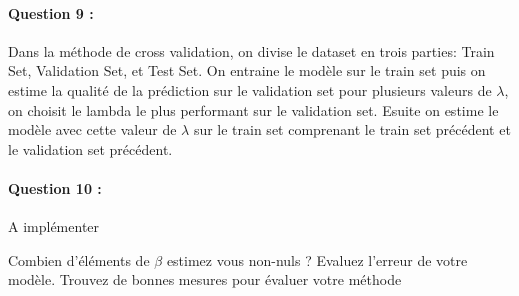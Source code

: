 \documentclass{article}
\begin{document}
\paragraph{Question 9 :}
Dans la méthode de cross validation, on divise le dataset en trois parties: 
Train Set, Validation Set, et Test Set.
On entraine le modèle sur le train set puis on estime la qualité de la prédiction sur le validation set pour plusieurs valeurs de $\lambda$, on choisit le lambda le plus performant sur le validation set. Esuite on estime le modèle avec cette valeur de $\lambda$ sur le train set comprenant le train set précédent et le validation set précédent.
\paragraph{Question 10 :}
A implémenter

Combien d’éléments de $\beta$ estimez vous non-nuls ? Evaluez l’erreur de votre modèle. Trouvez
de bonnes mesures pour évaluer votre méthode
\end{document}
